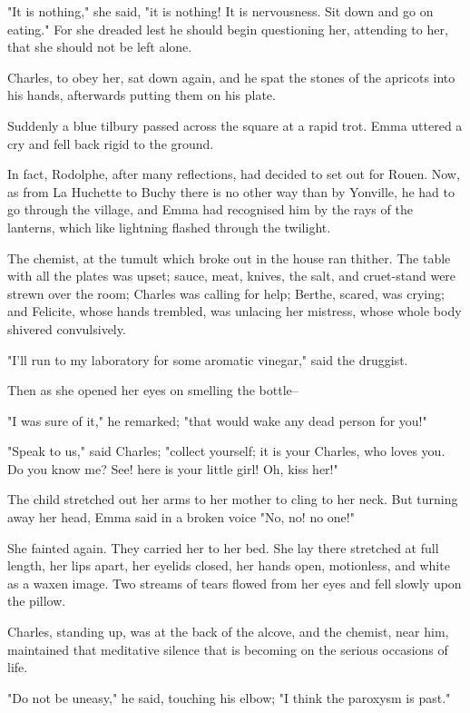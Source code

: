 \documentclass{tufte-book}
\begin{document}
"It is nothing," she said, "it is nothing! It is nervousness. Sit down
and go on eating." For she dreaded lest he should begin questioning her,
attending to her, that she should not be left alone.

Charles, to obey her, sat down again, and he spat the stones of the
apricots into his hands, afterwards putting them on his plate.

Suddenly a blue tilbury passed across the square at a rapid trot. Emma
uttered a cry and fell back rigid to the ground.

In fact, Rodolphe, after many reflections, had decided to set out for
Rouen. Now, as from La Huchette to Buchy there is no other way than by
Yonville, he had to go through the village, and Emma had recognised him
by the rays of the lanterns, which like lightning flashed through the
twilight.

The chemist, at the tumult which broke out in the house ran thither. The
table with all the plates was upset; sauce, meat, knives, the salt, and
cruet-stand were strewn over the room; Charles was calling for help;
Berthe, scared, was crying; and Felicite, whose hands trembled, was
unlacing her mistress, whose whole body shivered convulsively.

"I'll run to my laboratory for some aromatic vinegar," said the
druggist.

Then as she opened her eyes on smelling the bottle--

"I was sure of it," he remarked; "that would wake any dead person for
you!"

"Speak to us," said Charles; "collect yourself; it is your Charles, who
loves you. Do you know me? See! here is your little girl! Oh, kiss her!"

The child stretched out her arms to her mother to cling to her neck. But
turning away her head, Emma said in a broken voice "No, no! no one!"

She fainted again. They carried her to her bed. She lay there stretched
at full length, her lips apart, her eyelids closed, her hands open,
motionless, and white as a waxen image. Two streams of tears flowed from
her eyes and fell slowly upon the pillow.

Charles, standing up, was at the back of the alcove, and the chemist,
near him, maintained that meditative silence that is becoming on the
serious occasions of life.

"Do not be uneasy," he said, touching his elbow; "I think the paroxysm
is past."
\end{document}

